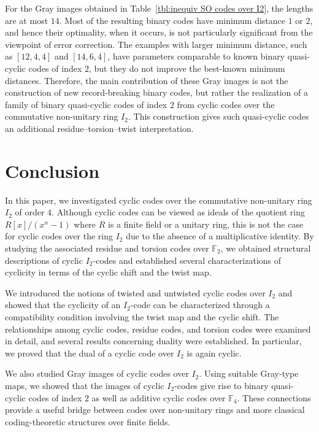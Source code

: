 \documentclass[12pt]{article}
\theoremstyle{definition}
\theoremstyle{plain}
\begin{document}
For the Gray images obtained in Table~\ref{tbl:inequiv SO codes over I2},
the lengths are at most $14$. Most of the resulting binary codes have
minimum distance $1$ or $2$, and hence their optimality, when it occurs, is
not particularly significant from the viewpoint of error correction. The
examples with larger minimum distance, such as $[12,4,4]$ and $[14,6,4]$,
have parameters comparable to known binary quasi-cyclic codes of index $2$,
but they do not improve the best-known minimum distances. Therefore, the
main contribution of these Gray images is not the construction of new
record-breaking binary codes, but rather the realization of a family of
binary quasi-cyclic codes of index $2$ from cyclic codes over the
commutative non-unitary ring $I_2$. This construction gives such
quasi-cyclic codes an additional residue--torsion--twist interpretation.



\section{Conclusion}
\label{sec: conclusion}

In this paper, we investigated cyclic codes over the commutative non-unitary ring $I_2$ of order $4$. Although cyclic codes can be viewed as ideals of the quotient ring $R[x] / (x^n - 1)$ where $R$ is a finite field or a unitary ring, this is not the case for cyclic codes over the ring $I_2$ due to the absence of a multiplicative identity. By studying the associated residue and torsion codes over $\mathbb{F}_2$, we obtained structural descriptions of cyclic $I_2$-codes and established several characterizations of cyclicity in terms of the cyclic shift and the twist map.

We introduced the notions of twisted and untwisted cyclic codes over $I_2$ and showed that the cyclicity of an $I_2$-code can be characterized through a compatibility condition involving the twist map and the cyclic shift. The relationships among cyclic codes, residue codes, and torsion codes were examined in detail, and several results concerning duality were established. In particular, we proved that the dual of a cyclic code over $I_2$ is again cyclic.

We also studied Gray images of cyclic codes over $I_2$. Using suitable Gray-type maps, we showed that the images of cyclic $I_2$-codes give rise to binary quasi-cyclic codes of index $2$ as well as additive cyclic codes over $\mathbb{F}_4$. These connections provide a useful bridge between codes over non-unitary rings and more classical coding-theoretic structures over finite fields.
\end{document}
